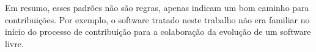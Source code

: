 Em resumo, esses padrões não são regras, apenas indicam um bom caminho para contribuições. Por exemplo, o software tratado neste trabalho não era familiar no início do processo de contribuição para a colaboração da evolução de um software livre.

